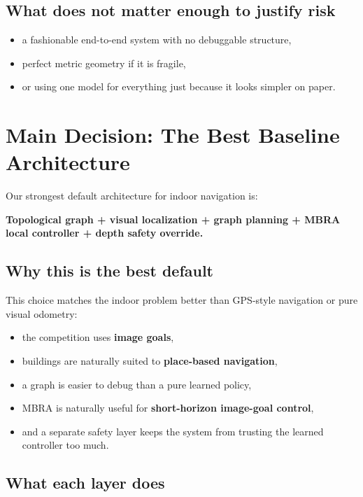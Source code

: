 \documentclass[11pt,a4paper]{article}
\begin{document}
\subsection{What does not matter enough to justify risk}

\begin{itemize}[nosep]
  \item a fashionable end-to-end system with no debuggable structure,
  \item perfect metric geometry if it is fragile,
  \item or using one model for everything just because it looks simpler on paper.
\end{itemize}


\section{Main Decision: The Best Baseline Architecture}

Our strongest default architecture for indoor navigation is:

\begin{mdframed}
\textbf{Topological graph + visual localization + graph planning + MBRA local
controller + depth safety override.}
\end{mdframed}

\subsection{Why this is the best default}

This choice matches the indoor problem better than GPS-style navigation or pure
visual odometry:
\begin{itemize}[nosep]
  \item the competition uses \textbf{image goals},
  \item buildings are naturally suited to \textbf{place-based navigation},
  \item a graph is easier to debug than a pure learned policy,
  \item MBRA is naturally useful for \textbf{short-horizon image-goal control},
  \item and a separate safety layer keeps the system from trusting the learned
        controller too much.
\end{itemize}

\subsection{What each layer does}
\end{document}
